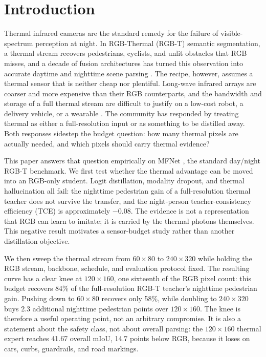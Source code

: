 \section{Introduction}

Thermal infrared cameras are the standard remedy for the failure of visible-spectrum
perception at night. In RGB-Thermal (RGB-T) semantic segmentation, a thermal stream
recovers pedestrians, cyclists, and unlit obstacles that RGB misses, and a decade of
fusion architectures has turned this observation into accurate daytime and nighttime
scene parsing \cite{ha2017mfnet,sun2019rtfnet,zhang2022crossmodal,zhang2023delivering}.
The recipe, however, assumes a thermal sensor that is neither cheap nor plentiful.
Long-wave infrared arrays are coarser and more expensive than their RGB counterparts,
and the bandwidth and storage of a full thermal stream are difficult to justify on a
low-cost robot, a delivery vehicle, or a wearable
\cite{shivakumar2019rgbthermal,stoyanov2026feasibility,walczyk2026hardware}.
The community has responded by treating thermal as either a full-resolution input or
as something to be distilled away. Both responses sidestep the budget question: how
many thermal pixels are actually needed, and which pixels should carry thermal
evidence?

This paper answers that question empirically on MFNet \cite{ha2017mfnet}, the standard
day/night RGB-T benchmark. We first test whether the thermal advantage can be moved
into an RGB-only student. Logit distillation, modality dropout, and thermal
hallucination all fail: the nighttime pedestrian gain of a full-resolution thermal
teacher does not survive the transfer, and the night-person teacher-consistency
efficiency (TCE) is approximately $-0.08$. The evidence is not a representation that
RGB can learn to imitate; it is carried by the thermal photons themselves. This
negative result motivates a sensor-budget study rather than another distillation
objective.

We then sweep the thermal stream from $60\times80$ to $240\times320$ while holding the
RGB stream, backbone, schedule, and evaluation protocol fixed. The resulting curve has
a clear knee at $120\times160$, one sixteenth of the RGB pixel count: this budget
recovers 84\% of the full-resolution RGB-T teacher's nighttime pedestrian gain. Pushing down
to $60\times80$ recovers only 58\%, while doubling to $240\times320$ buys 2.3
additional nighttime pedestrian points over $120\times160$. The knee is therefore a
useful operating point, not an arbitrary compromise. It is also a statement about the
safety class, not about overall parsing: the $120\times160$ thermal expert reaches
41.67 overall mIoU, 14.7 points below RGB, because it loses on cars, curbs, guardrails,
and road markings.

